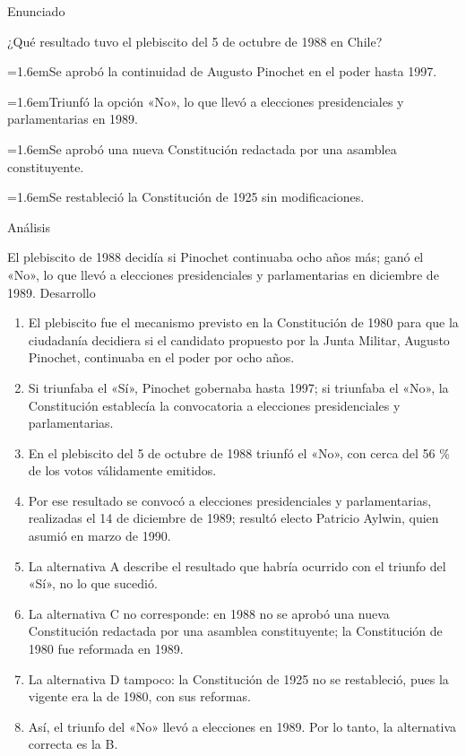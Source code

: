 \documentclass[10pt,a4paper,twocolumn]{article}
\newcommand{\alternativa}[2]{\par\noindent\hangindent=1.6em\hangafter=1\makebox[1.6em][l]{\tecla{#1}}#2\par}
\newcommand{\clave}[1]{\par\smallskip{\sffamily\footnotesize\color{esmeralda} Clave \teclaok{#1}}\par}
\begin{document}
\begin{ejemplo}
{\sffamily\footnotesize\color{zinc500} Enunciado}\par
¿Qué resultado tuvo el plebiscito del 5 de octubre de 1988 en Chile?
\alternativa{A}{Se aprobó la continuidad de Augusto Pinochet en el poder hasta 1997.}
\alternativa{B}{Triunfó la opción «No», lo que llevó a elecciones presidenciales y parlamentarias en 1989.}
\alternativa{C}{Se aprobó una nueva Constitución redactada por una asamblea constituyente.}
\alternativa{D}{Se restableció la Constitución de 1925 sin modificaciones.}
\clave{B}
{\sffamily\footnotesize\color{zinc500} Análisis}\par El plebiscito de 1988 decidía si Pinochet continuaba ocho años más; ganó el «No», lo que llevó a elecciones presidenciales y parlamentarias en diciembre de 1989.
{\sffamily\footnotesize\color{zinc500} Desarrollo}
\begin{enumerate}
  \item El plebiscito fue el mecanismo previsto en la Constitución de 1980 para que la ciudadanía decidiera si el candidato propuesto por la Junta Militar, Augusto Pinochet, continuaba en el poder por ocho años.
  \item Si triunfaba el «Sí», Pinochet gobernaba hasta 1997; si triunfaba el «No», la Constitución establecía la convocatoria a elecciones presidenciales y parlamentarias.
  \item En el plebiscito del 5 de octubre de 1988 triunfó el «No», con cerca del 56 \% de los votos válidamente emitidos.
  \item Por ese resultado se convocó a elecciones presidenciales y parlamentarias, realizadas el 14 de diciembre de 1989; resultó electo Patricio Aylwin, quien asumió en marzo de 1990.
  \item La alternativa A describe el resultado que habría ocurrido con el triunfo del «Sí», no lo que sucedió.
  \item La alternativa C no corresponde: en 1988 no se aprobó una nueva Constitución redactada por una asamblea constituyente; la Constitución de 1980 fue reformada en 1989.
  \item La alternativa D tampoco: la Constitución de 1925 no se restableció, pues la vigente era la de 1980, con sus reformas.
  \item Así, el triunfo del «No» llevó a elecciones en 1989. Por lo tanto, la alternativa correcta es la B.
\end{enumerate}
\end{ejemplo}
\end{document}
